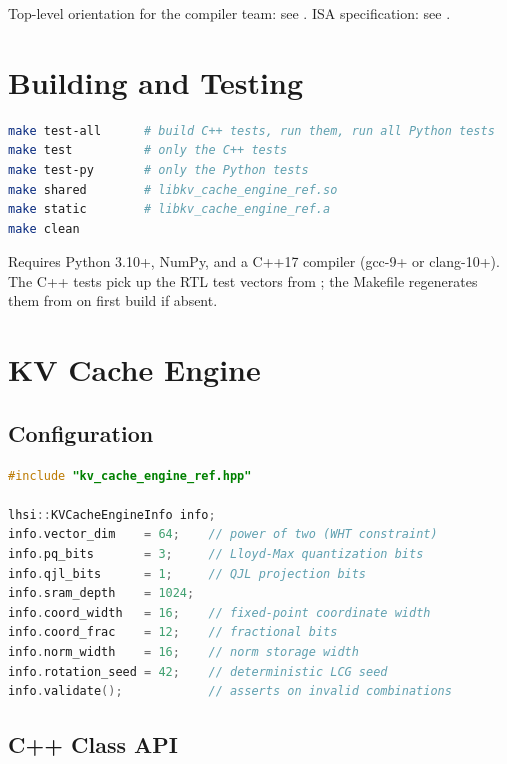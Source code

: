 \documentclass[11pt]{article}
\begin{document}
\noindent Top-level orientation for the compiler team: see
. ISA specification: see
.

\section{Building and Testing}
\label{sec:build}

\begin{lstlisting}[language=bash]
make test-all      # build C++ tests, run them, run all Python tests
make test          # only the C++ tests
make test-py       # only the Python tests
make shared        # libkv_cache_engine_ref.so
make static        # libkv_cache_engine_ref.a
make clean
\end{lstlisting}

\noindent Requires Python 3.10+, NumPy, and a C++17 compiler (gcc-9+ or
clang-10+). The C++ tests pick up the RTL test vectors from
; the Makefile regenerates them from
 on first build if absent.

\section{KV Cache Engine}
\label{sec:kvcache}

\subsection{Configuration}

\begin{lstlisting}[language=C++]
#include "kv_cache_engine_ref.hpp"

lhsi::KVCacheEngineInfo info;
info.vector_dim    = 64;    // power of two (WHT constraint)
info.pq_bits       = 3;     // Lloyd-Max quantization bits
info.qjl_bits      = 1;     // QJL projection bits
info.sram_depth    = 1024;
info.coord_width   = 16;    // fixed-point coordinate width
info.coord_frac    = 12;    // fractional bits
info.norm_width    = 16;    // norm storage width
info.rotation_seed = 42;    // deterministic LCG seed
info.validate();            // asserts on invalid combinations
\end{lstlisting}

\subsection{C++ Class API}
\end{document}
